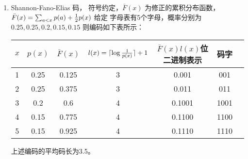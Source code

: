 \documentclass{article}
\DeclarePairedDelimiter\ceil{\lceil}{\rceil}
\begin{document}
\begin{enumerate}
\begin{proof}
考虑缩减信源$\mathcal{X}'$,其中$p'_i=p_i,i=1,\dots,m-2,p'_{m-1}=p_{m-1}+p_m$，设$C_1^*$为$\mathcal{X}'$的Huffman编码，
根据归纳假设对于任意$\mathcal{X}'$上的即时码$C_1$,有$L(C_1^*)\leq L(C_1)$。

另一方面：$L(C)=L(C'_1)+p_{m-1}+p_m$
其中$C'_1$是$\mathcal{X}'$上的编码方法，其由$C$诱导出，诱导规则为，对于前$m-2$个字元码元不变，码长仍为$l_1,\dots,l_{m-2}$，对于第$m-1$个字元，由于$C$是即时码，
将原来$x_{m-1}$或$x_{m}$的码字最后一位去掉可作为第$m-1$个字元的码字，码长为$l_{m-1}-1$。

$\Rightarrow L(C) \geq L(C_1^*)+p_{m-1}+p_m$,不等式右端为常数（给定$\mathcal{X}$）。
\begin{align*}
L(C_1^*)+p_{m-1}+p_m & = \sum_{i=1}^{m-2} ( p'_i l^*_i )+ l^*_{m-1}p'_{m-1}+p_{m-1}+p_m \\
                      & = \sum_{i=1}^{m-2} ( p_i l^*_i )+ (l^*_{m-1}+1)p_{m-1}+(l^*_{m-1}+1)p_m \\
                      & = \sum_{i=1}^{m} p_i l^*_i 
\end{align*}
由 Huffmann编码的构造过程可知，上式等于 $L(C^*)$, 其中$C^*$是$\mathcal{X}$的 Huffman编码 $\Rightarrow L(C)\geq L(C^*)$。
根据归纳法可知对任意有限字母表，均有$L(C)\geq L(C^*)$。
\end{proof}
\item Shannon-Fano-Elias 码，
符号约定，$\bar{F}(x)$ 为修正的累积分布函数， $\bar{F}(x) = \sum_{a<x} p(a) + {1 \over 2} p(x) $
给定 字母表有5个字母，概率分别为 $ 0.25, 0.25, 0.2, 0.15, 0.15 $
则编码如下表所示：
\begin{table}[!ht]
\centering
\begin{tabular}{ccccccc}
\hline
$x$ & $ p(x) $ & $\bar{F}(x)$ & $l(x) = \ceil{\log{1 \over p(x)}}+1$ & $\bar{F}(x) l(x)$位二进制表示 & 码字 \\
\hline
1 & 0.25 & 0.125 & 3 & 0.001 & 001\\
2 & 0.25 & 0.375 & 3 & 0.011 & 011\\ 
3 & 0.2 & 0.6 & 4 & 0.1001 & 1001\\
4 & 0.15 & 0.775 & 4 & 0.1100 & 1100\\
5 & 0.15 & 0.925 & 4 & 0.1110 & 1110\\
\hline
\end{tabular}
\end{table}
上述编码的平均码长为3.5。
\end{enumerate}
\end{document}
